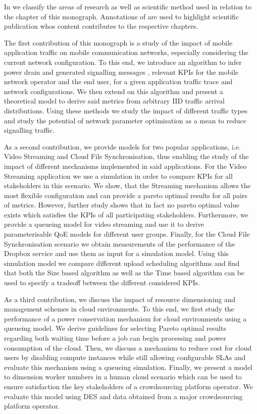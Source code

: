 In  we classify the areas of research as well as scientific method used in relation to the chapter of this monograph.
Annotations of are used to highlight scientific publication whos content contributes to the respective chapters.

The first contribution of this monograph is a study of the impact of mobile application traffic on mobile communication networks, especially considering the current network configuration.
To this end, we introduce an algorithm to infer power drain and generated signalling messages , relevant \glspl{KPI} for the mobile network operator and the end user, for a given application traffic trace and network configurations.
We then extend on this algorithm and present a theoretical model to derive said metrics from arbitrary \gls{IID} traffic arrival distributions.
Using these methods we study the impact of different traffic types and study the potential of network parameter optimisation as a mean to reduce signalling traffic.

As a second contribution, we provide models for two popular applications, i.e. Video Streaming and Cloud File Synchronisation, thus enabling the study of the impact of different mechanisms implemented in said applications.
For the Video Streaming application we use a simulation in order to compare \glspl{KPI} for all stakeholders in this scenario.
We show, that the Streaming mechanism allows the most flexible configuration and can provide a pareto optimal results for all pairs of metrics.
However, further study shows that in fact no pareto optimal value exists which satisfies the \glspl{KPI} of all participating stakeholders.
Furthermore, we provide a queueing model for video streaming and use it to derive parameterisable \gls{QoE} models for different user groups.
Finally, for the Cloud File Synchronisation scenario we obtain measurements of the performance of the Dropbox service and use them as input for a simulation model.
Using this simulation model we compare different upload scheduling algorithms and find that both the Size based algorithm as well as the Time based algorithm can be used to specify a tradeoff between the different considered \glspl{KPI}.

As a third contribution, we discuss the impact of resource dimensioning and management schemes in cloud environments.
To this end, we first study the performance of a power conservation mechanism for cloud environments using a queueing model.
We derive guidelines for selecting Pareto optimal results regarding both waiting time before a job can begin processing and power consumption of the cloud.
Then, we discuss a mechanism to reduce cost for cloud users by disabling compute instances while still allowing configurable \glspl{SLA} and evaluate this mechanism using a queueing simulation.
Finally, we present a model to dimension worker numbers in a human cloud scenario which can be used to ensure satisfaction the key stakeholders of a crowdsourcing platform operator.
We evaluate this model using \gls{DES} and data obtained from a major crowdsourcing platform operator. 

